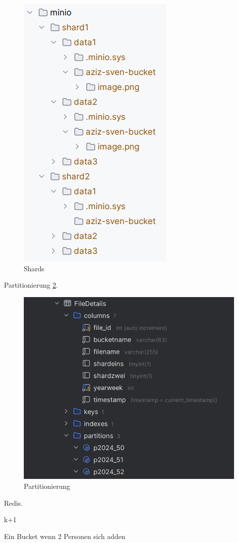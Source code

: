 \documentclass[12pt]{report}
\begin{document}
			\begin{figure}[h]
				\centering
				\includegraphics[width=0.4\linewidth]{shards}
				\caption{Shards}
				\label{fig:shards}
			\end{figure}
			
			Partitionierung \ref{fig:partitionierung}.
			
			\begin{figure}[h]
				\centering
				\includegraphics[width=0.8\linewidth]{partitionierung}
				\caption{Partitionierung}
				\label{fig:partitionierung}
			\end{figure}
			
			Redis.
			
			k+1 
			
			Ein Bucket wenn 2 Personen sich adden
			
\end{document}

